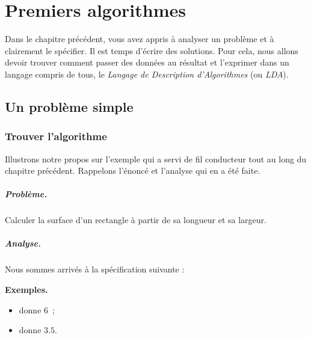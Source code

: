 \chapter{Premiers algorithmes}

	Dans le chapitre précédent,
	vous avez appris à analyser un problème
	et à clairement le spécifier.
	Il est temps d’écrire des solutions.
	Pour cela, nous allons devoir trouver
	comment passer des données au résultat
	et l’exprimer dans un langage compris de tous, 
	le \emph{Langage de Description d’Algorithmes} 
	(ou \emph{LDA}).
	
	\section{Un problème simple}
	
		\subsection{Trouver l’algorithme}

			Illustrons notre propos sur l’exemple 
			qui a servi de fil conducteur
			tout au long du chapitre précédent.
			Rappelons l’énoncé et l’analyse qui en a été faite.
			
			\begin{Emphase}
				\paragraph{Problème.}
				Calculer la surface d’un rectangle 
				à partir de sa longueur et sa largeur.
			
				\paragraph{Analyse.} 
				Nous sommes arrivés à la spécification suivante :
				\begin{center}
				\end{center}
				
				\textbf{Exemples.} 
				\begin{multicols}{2}
					\begin{itemize}
					\item {} donne $6$~;
					\item {} donne $3.5$.		
					\end{itemize}
				\end{multicols}
			\end{Emphase}
			
